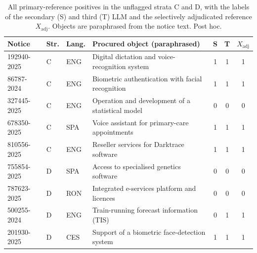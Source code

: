 \documentclass[runningheads]{llncs}
\begin{document}
\begin{table}[t]
\caption{All primary-reference positives in the unflagged strata C and D, with the labels of the secondary (S) and third (T) LLM and the selectively adjudicated reference $X_{\mathrm{adj}}$. Objects are paraphrased from the notice text. Post hoc.}\label{tab:cases}
\centering
\begin{tabular}{llllccc}
\toprule
Notice & Str. & Lang. & Procured object (paraphrased) & S & T & $X_{\mathrm{adj}}$ \\
\midrule
192940-2025 & C & ENG & Digital dictation and voice-recognition system & 1 & 1 & 1 \\
86787-2024  & C & ENG & Biometric authentication with facial recognition & 1 & 1 & 1 \\
327445-2025 & C & ENG & Operation and development of a statistical model & 0 & 0 & 0 \\
678350-2025 & C & SPA & Voice assistant for primary-care appointments & 1 & 1 & 1 \\
810556-2025 & C & ENG & Reseller services for Darktrace software & 1 & 1 & 1 \\
755854-2025 & D & SPA & Access to specialised genetics software & 0 & 0 & 0 \\
787623-2025 & D & RON & Integrated e-services platform and licences & 0 & 0 & 0 \\
500255-2024 & D & ENG & Train-running forecast information (TIS) & 0 & 1 & 1 \\
201930-2025 & D & CES & Support of a biometric face-detection system & 1 & 1 & 1 \\
\bottomrule
\end{tabular}
\end{table}
\end{document}
